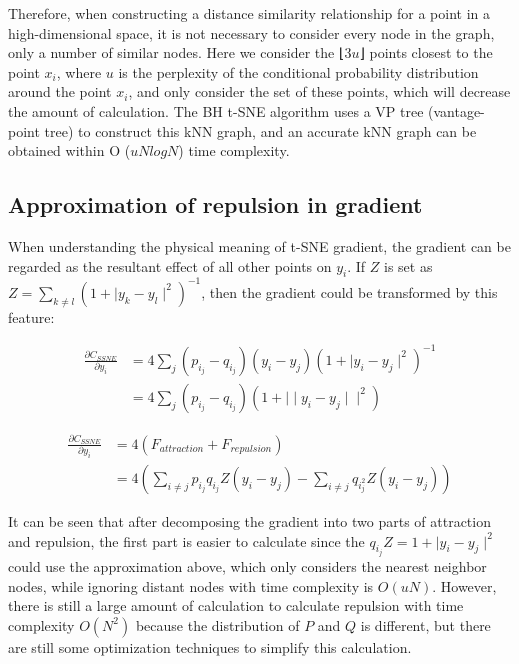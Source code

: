 \noindent Therefore, when constructing a distance similarity relationship for a point in a high-dimensional space, it is not necessary to consider every node in the graph, only a number of similar nodes. Here we consider the ⌊3$u$⌋ points closest to the point $x_i$, where $u$ is the perplexity of the conditional probability distribution around the point $x_i$, and only consider the set of these points, which will decrease the amount of calculation. The BH t-SNE algorithm uses a VP tree (vantage-point tree) to construct this kNN graph, and an accurate kNN graph can be obtained within O ($uNlogN$) time complexity.\\

\subsection{Approximation of repulsion in gradient}

When understanding the physical meaning of t-SNE gradient, the gradient can be regarded as the resultant effect of all other points on $y_i$. If $Z$ is set as $Z = \sum_{k \neq l} (1+ \mid y_k−y_l \mid ^2)^{-1}$, then the gradient could be transformed by this feature:

\begin{equation*}
\begin{aligned}
\frac{\partial C_{SSNE}}{\partial y_i} &= {4\sum_j(p_i_j - q_i_j)(y_i - y_j)(1 + \mid y_i - y_j \mid ^ 2) ^{-1}}\\
&= {4\sum_j(p_i_j - q_i_j) (1 + \mid \mid y_i - y_j \mid \mid ^ 2)}
\end{aligned}
\end{equation*}

\begin{equation*}
\begin{aligned}
\frac{\partial C_{SSNE}}{\partial y_i} &= {4(F_{attraction} + F_{repulsion})}\\
&= 4({\sum_{i \neq j}p_i_j q_i_j Z (y_i - y_j)} - {\sum_{i \neq j}q_i_j^2 Z (y_i - y_j)}) 
\end{aligned}
\end{equation*}

\noindent It can be seen that after decomposing the gradient into two parts of attraction and repulsion, the first part is easier to calculate since the $q_i_j Z = 1 + \mid y_i - y_j \mid ^ 2 $ could use the approximation above, which only considers the nearest neighbor nodes, while ignoring distant nodes with time complexity is $O(uN)$. However, there is still a large amount of calculation to calculate repulsion with time complexity $O(N^2)$ because the distribution of $P$ and $Q$ is different, but there are still some optimization techniques to simplify this calculation.\\

